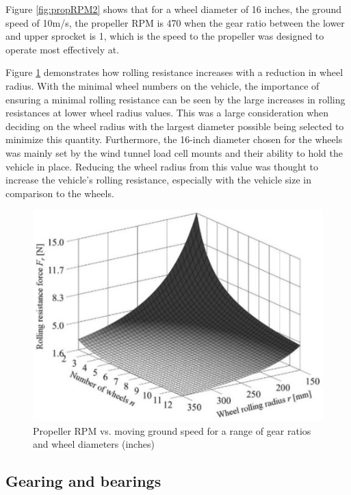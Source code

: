 Figure \ref{fig:propRPM2} shows that for a wheel diameter of 16 inches, the ground speed of 10m/s, the propeller RPM is 470 when the gear ratio between the lower and upper sprocket is 1, which is the speed to the propeller was designed to operate most effectively at.

Figure \ref{fig:rollResistance} demonstrates how rolling resistance increases with a reduction in wheel radius. With the minimal wheel numbers on the vehicle, the importance of ensuring a minimal rolling resistance can be seen by the large increases in rolling resistances at lower wheel radius values. This was a large consideration when deciding on the wheel radius with the largest diameter possible being selected to minimize this quantity. Furthermore, the 16-inch diameter chosen for the wheels was mainly set by the wind tunnel load cell mounts and their ability to hold the vehicle in place. Reducing the wheel radius from this value was thought to increase the vehicle's rolling resistance, especially with the vehicle size in comparison to the wheels.

\begin{figure}[!htbp]
    \centering
    \includegraphics{images/part9/rollingResistance.jpg}
    \caption{Propeller RPM vs. moving ground speed for a range of gear ratios and wheel diameters (inches) \cite{Baldissera}}
    \label{fig:rollResistance}
\end{figure}

\subsection{Gearing and bearings}


